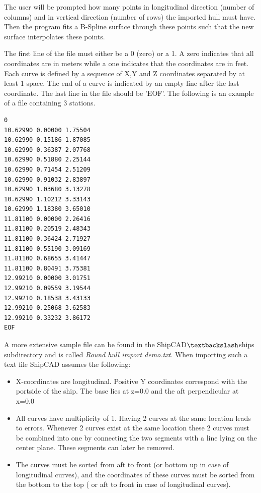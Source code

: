 \documentclass[12pt]{article}
\begin{document}
The user will be prompted how many points in longitudinal direction
(number of columns) and in vertical direction (number of rows) the
imported hull must have. Then the program fits a B-Spline surface
through these points such that the new surface interpolates these
points.

The first line of the file must either be a 0 (zero) or a 1. A zero
indicates that all coordinates are in meters while a one indicates
that the coordinates are in feet. Each curve is defined by a sequence
of X,Y and Z coordinates separated by at least 1 space. The end of a
curve is indicated by an empty line after the last coordinate. The
last line in the file should be 'EOF'. The following is an example of
a file containing 3 stations.

\begin{verbatim}
0 
10.62990 0.00000 1.75504 
10.62990 0.15186 1.87085 
10.62990 0.36387 2.07768 
10.62990 0.51880 2.25144
10.62990 0.71454 2.51209 
10.62990 0.91032 2.83897 
10.62990 1.03680 3.13278 
10.62990 1.10212 3.33143 
10.62990 1.18380 3.65010 
11.81100 0.00000 2.26416 
11.81100 0.20519 2.48343 
11.81100 0.36424 2.71927 
11.81100 0.55190 3.09169 
11.81100 0.68655 3.41447 
11.81100 0.80491 3.75381 
12.99210 0.00000 3.01751 
12.99210 0.09559 3.19544 
12.99210 0.18538 3.43133 
12.99210 0.25068 3.62583 
12.99210 0.33232 3.86172 
EOF 
\end{verbatim}

A more extensive sample file can be found in the ShipCAD$\textbackslash$ships
subdirectory and is called \textit{Round hull import demo.txt}. When
importing such a text file ShipCAD assumes the following:

\begin{itemize}

  \item X-coordinates are longitudinal.  Positive Y coordinates
correspond with the portside of the ship. The base lies at z=0.0 and
the aft perpendicular at x=0.0

  \item All curves have multiplicity of 1. Having 2 curves at the same
location leads to errors.  Whenever 2 curves exist at the same
location these 2 curves must be combined into one by connecting the
two segments with a line lying on the center plane. These segments can
later be removed.

  \item The curves must be sorted from aft to front (or bottom up in
case of longitudinal curves), and the coordinates of these curves must
be sorted from the bottom to the top ( or aft to front in case of
longitudinal curves).

\end{itemize}
\end{document}
